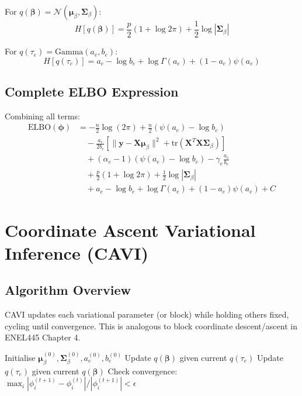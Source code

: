 \documentclass[11pt]{article}
\newcommand{\N}{\mathcal{N}}
\newcommand{\ELBO}{\text{ELBO}}
\newcommand{\tr}{\text{tr}}
\begin{document}
For $q(\bm{\beta}) = \N(\bm{\mu}_\beta, \bm{\Sigma}_\beta)$:
\begin{equation}
H[q(\bm{\beta})] = \frac{p}{2}(1 + \log 2\pi) + \frac{1}{2}\log |\bm{\Sigma}_\beta|
\label{eq:entropy_beta}
\end{equation}

For $q(\tau_e) = \text{Gamma}(a_e, b_e)$:
\begin{equation}
H[q(\tau_e)] = a_e - \log b_e + \log \Gamma(a_e) + (1-a_e)\psi(a_e)
\label{eq:entropy_tau}
\end{equation}

\subsection{Complete ELBO Expression}

Combining all terms:
\begin{align}
\ELBO(\bm{\phi}) &= -\frac{n}{2}\log(2\pi) + \frac{n}{2}(\psi(a_e) - \log b_e) \nonumber\\
&\quad - \frac{a_e}{2b_e} \left[\|\bm{y} - \bm{X}\bm{\mu}_\beta\|^2 + \tr(\bm{X}^T\bm{X}\bm{\Sigma}_\beta)\right] \nonumber\\
&\quad + (\alpha_e - 1)(\psi(a_e) - \log b_e) - \gamma_e \frac{a_e}{b_e} \nonumber\\
&\quad + \frac{p}{2}(1 + \log 2\pi) + \frac{1}{2}\log |\bm{\Sigma}_\beta| \nonumber\\
&\quad + a_e - \log b_e + \log \Gamma(a_e) + (1-a_e)\psi(a_e) + C
\label{eq:elbo_full}
\end{align}

\section{Coordinate Ascent Variational Inference (CAVI)}

\subsection{Algorithm Overview}

CAVI updates each variational parameter (or block) while holding others fixed, cycling until convergence. This is analogous to block coordinate descent/ascent in ENEL445 Chapter 4.

\begin{algorithm}
\caption{Coordinate Ascent VI}
\begin{algorithmic}[1]
 \State Initialise $\bm{\mu}_\beta^{(0)}, \bm{\Sigma}_\beta^{(0)}, a_e^{(0)}, b_e^{(0)}$
    \State Update $q(\bm{\beta})$ given current $q(\tau_e)$
    \State Update $q(\tau_e)$ given current $q(\bm{\beta})$
    \State Check convergence: $\max_i |\phi_i^{(t+1)} - \phi_i^{(t)}| / |\phi_i^{(t+1)}| < \epsilon$
\EndFor
\end{algorithmic}
\end{algorithm}
\end{document}
